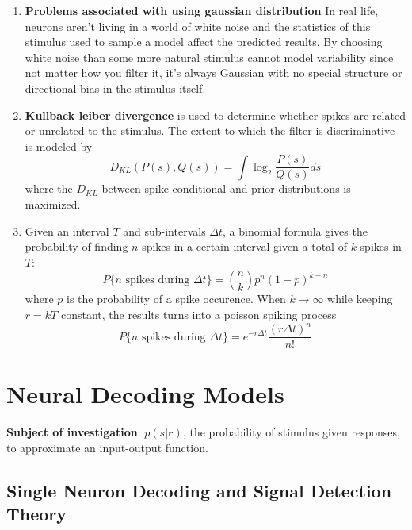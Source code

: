 \documentclass[11pt]{article}
\begin{document}
\begin{enumerate}
    \item \textbf{Problems associated with using gaussian distribution} In real life, neurons aren't living in a world of white noise and the statistics of this stimulus used to sample a model affect the predicted results. By choosing white noise than some more natural stimulus cannot model variability since not matter how you filter it, it's always Gaussian with no special structure or directional bias in the stimulus itself.
    \item \textbf{Kullback leiber divergence} is used to determine whether spikes are related or unrelated to the stimulus. The extent to which the filter is discriminative is modeled by \begin{equation*}
        D_{KL}(P(s),Q(s))=\int \log_2 \frac{P(s)}{Q(s)} ds
    \end{equation*}
    where the $D_{KL}$ between spike conditional and prior distributions is maximized.
    \item Given an interval $T$ and sub-intervals $\Delta t$, a binomial formula gives the probability of finding $n$ spikes in a certain interval given a total of $k$ spikes in $T$:\begin{equation*}
        P\{n\text{ spikes during $\Delta t$}\}=\binom{n}{k}p^{n}(1-p)^{k-n} 
    \end{equation*}where $p$ is the probability of a spike occurence. When $k\to \infty$ while keeping $r=kT$ constant, the results turns into a poisson spiking process
    \begin{equation*}
        P\{n\text{ spikes during $\Delta t$}\}=e^{-r\Delta t}\frac{(r\Delta t)^n}{n!}
    \end{equation*}
\end{enumerate}

\newpage
\section{Neural Decoding Models}
\noindent \textbf{Subject of investigation}: $p(s|\mathbf{r})$, the probability of stimulus given responses, to approximate an input-output function.

\subsection{Single Neuron Decoding and Signal Detection Theory}
\end{document}
